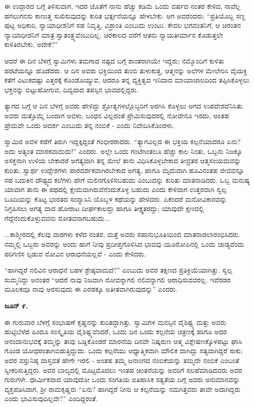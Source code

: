 ಈ ಉದ್ಗಾರದ ಬಗ್ಗೆ ತಿಳಿಸುವಾಗ, ಇದರ ಜೊತೆಗೆ ನಾನು ಹೆಚ್ಚು ಕಡಿಮೆ ಒಂದು ವರ್ಷದ ನಂತರ ಕೇಳಿದ, ನಾವೆಲ್ಲ ಹಗಲುಗನಸು ಕಾಣುತ್ತ ಸುಖಿಸುವುದನ್ನು ಕುರಿತ ಭರ್ತ್ಸನೆಯನ್ನೂ ಹೇಳಬೇಕು. ಆಗ ಅವರೆಂದರು: “ಪ್ರತಿಯೊಬ್ಬ ಸಣ್ಣ ಪುಟ್ಟ ಅಧಿಕಾರಿ, ನ್ಯಾಯಾಧೀಶನಿಗೆ ಸಹ ನಿವೃತ್ತಿ, ವಿಶ್ರಾಂತಿ ಎಂಬುದು ಉಂಟು. ಕೇವಲ ಭಗವಂತನಿಗೆ, ಆ ಚಿರಂತನ ನ್ಯಾಯಾಧೀಶನಿಗೆ ಮಾತ್ರ ಸ್ವಾತಂತ್ರ್ಯವೆಂಬುದಿಲ್ಲ. ಚಿರಕಾಲದ ವರೆಗೆ ಆತನು ನ್ಯಾಯತೀರ್ಮಾನ ಕೊಡುತ್ತಲೇ ಕುಳಿತಿರಬೇಕು, ಅದೇಕೆ?”

ಆದರೆ ಈ ದಿನ ಬೆಳಗ್ಗೆ ಸ್ವಾಮಿಗಳು ತಮಗಾದ ನಷ್ಟದ ಬಗ್ಗೆ ಶಾಂತರಾಗಿಯೇ ಇದ್ದರು; ನಮ್ಮೊಂದಿಗೆ ಕುಳಿತು ಹರಟೆಯನ್ನೂ ಹೊಡೆದರು. ಆ ದಿನ ಅವರು ಭಕ್ತಿಯಿಂದ ತುಂಬಿ ತುಳುಕುತ್ತ, ಆತ್ಮನನ್ನು ಅಲೆಗಳ ಮೇಲೇರಿಸಿ ವೈಯಕ್ತಿ ಕತೆಗೆ ಎಟುಕದಷ್ಟು ಎತ್ತರಕ್ಕೆ ಕೊಂಡೊಯ್ಯುವ, ಆದರೂ ತನ್ನ ವ್ಯಕ್ತಿತ್ವದ ಇನಿದಾದ ಮಾಯಾಜಾಲದಿಂದ ತಪ್ಪಿಸಿಕೊಳ್ಳಲು ಭಕ್ತನನ್ನು ಬಿಟ್ಟುಹೋಗುವ, ದಿವ್ಯವಾದ ತಪಸ್ಸಿನ ಭಾವದಲ್ಲಿದ್ದರು.

ತ್ಯಾಗದ ಬಗ್ಗೆ ಆ ದಿನ ಬೆಳಗ್ಗೆ ಅವರು ಹೇಳಿದ್ದು ಶ್ರೋತೃಗಳಲ್ಲೊಬ್ಬರಿಗೆ ಅರಗಿಸಿ ಕೊಳ್ಳಲು ಆಗದ ಉಪದೇಶವೆನಿಸಿತು. ಅವರು ಮತ್ತೊಮ್ಮೆ ಬಂದಾಗ ಅವಳು, ಬಂಧನ ವಿಲ್ಲದಂತೆ ಪ್ರೇಮಿಸುವುದರಲ್ಲಿ ನೋವೇನೂ ಇರದು, ಅಂತಹ ಪ್ರೇಮವೇ ಒಂದು ಆದರ್ಶ ಎಂಬುದು ತನ್ನ ನಂಬಿಕೆ - ಎಂದು ನಿವೇದಿಸಿಕೊಂಡಳು.

ಸ್ವಾಮಿಜಿ ಅವಳ ಕಡೆಗೆ ತಿರುಗಿ ಇದ್ದಕ್ಕಿದ್ದಂತೆ ಗಂಭೀರರಾದರು. “ತ್ಯಾಗವಿಲ್ಲದ ಈ ಭಕ್ತಿಯ ಕಲ್ಪನೆಯಾದರೂ ಏನು? ಅದು ಅತ್ಯಂತ ಮಾರಕವಾದುದು!” ಎಂದರು. ಅಲ್ಲೇ ಒಂದು ಗಂಟೆಗಿಂತಲೂ ಹೆಚ್ಚು ಕಾಲ ನಿಂತು, ಒಬ್ಬನು ನಿಜಕ್ಕೂ ಅಸಕ್ತನಾಗಿ ಉಳಿಯ ಬೇಕಾದರೆ ಅಗತ್ಯವಾಗಿ ತನ್ನ ಮೇಲೆ ತಾನು ವಿಧಿಸಿಕೊಳ್ಳಬೇಕಾದ ತೀವ್ರತರ ಆತ್ಮಸಂಯಮವನ್ನು ಕುರಿತು, ಸ್ವಾರ್ಥ ಉದ್ದೇಶಗಳು ಪಾರದರ್ಶಕವಾಗಿರಬೇಕಾದ ಅಗತ್ಯ, ಹಾಗೂ ಮೃದುವಾಗಿ ಹೂವಿನಂತಹ ಜೀವವನ್ನೂ ಸಹ ಬದುಕಿನ ದೌಷ್ಟ್ಯದ ಕಲೆಗಳು ಹೇಗೆ ಮಲಿನಗೊಳಿಸಬಹುದು ಎಂಬುದನ್ನು ಕುರಿತು ಮಾತನಾಡಿದರು. ಒಬ್ಬ ಮನುಷ್ಯ ಯಾವಾಗ ತಾನು ಈ ಪಥದಲ್ಲಿ ಕ್ಷೇಮವಾಗಿರುವೆನೆಂದುಕೊಳ್ಳ ಬಹುದು ಎಂದು ಕೇಳಿದಾಗ ಉತ್ತರವಾಗಿ ಸ್ವಲ್ಪ ಬೂದಿಯನ್ನು ಕೊಟ್ಟ ಭಾರತದ ಸಂನ್ಯಾಸಿನಿ ಯೊಬ್ಬಳ ಕಥೆಯನ್ನು ಹೇಳಿದರು. ಏಕೆಂದರೆ ಮನೋವಿಕಾರವನ್ನು ನಿಗ್ರಹಿಸಲು ಅಗತ್ಯ ವಾದ ಹೋರಾಟ ದೀರ್ಘಕಾಲದ್ದು ಹಾಗೂ ತೀಕ್ಷ್ಣತರದ್ದು; ಯಾವುದೇ ಕ್ಷಣದಲ್ಲಿ ಗೆದ್ದೆನೆಂದುಕೊಳ್ಳುವವನು ಸೋತವನಾಗಬಹುದು...

...ಕಾಶ್ಮೀರದಲ್ಲಿ ಕೆಲವು ವಾರಗಳು ಕಳೆದ ನಂತರ, ಮತ್ತೆ ಅವರು ಸಹಾನುಭೂತಿಯಿಂದ ಮಾತನಾಡಲಾರಂಭಿಸಿದರು. ನಮ್ಮಲ್ಲಿ ಒಬ್ಬರು ಅವರನ್ನು ಅಂದು ಹಾಗೆ ನೀವು ಪ್ರದೀಪ್ತಗೊಳಿಸಿದ ಭಾವವು ಯೂರೋಪಿನಲ್ಲಿ ಒಂದು ಜಾಡ್ಯವೆಂದು ಪರಿಗಣಿಸ ಲ್ಪಡುವ ನೋವಿನ ಆರಾಧನೆಯಲ್ಲವೆ - ಎಂದು ಕೇಳಿದರು.

“ಹಾಗಿದ್ದರೆ ನಲಿವಿನ ಆರಾಧನೆ ಬಹಳ ಶ್ರೇಷ್ಠವಾದುದೆ?” ಎಂಬುದು ಅವರ ತಕ್ಷಣದ ಪ್ರತಿಕ್ರಿಯೆಯಾಗಿತ್ತು. ಸ್ವಲ್ಪ ಸುಮ್ಮನಿದ್ದು ಅನಂತರ “ಆದರೆ ನಾವು ನಿಜವಾಗಿ ನೋವನ್ನಾಗಲಿ ನಲಿವನ್ನಾಗಲಿ ಆರಾಧಿಸುವವರಲ್ಲ. ಇವೆರಡರ ಮೂಲಕವೂ ನಾವು ಅರಸುವುದು ಈ ಎರಡಕ್ಕೂ ಅತೀತವಾಗಿರುವುದನ್ನು” ಎಂದರು.

\textbf{ಜೂನ್ ೯.}

ಈ ಗುರುವಾರ ಬೆಳಗ್ಗೆ ಸಂಭಾಷಣೆ ಕೃಷ್ಣನನ್ನು ಕುರಿತದ್ದಾಗಿತ್ತು. ಸ್ವಾಮಿಗಳ ಮನಸ್ಸಿನ ವೈಶಿಷ್ಟ್ಯ ಮತ್ತು ಅವರು ಹುಟ್ಟಿಬೆಳೆದ ಹಿಂದೂ ಸಂಸ್ಕೃತಿಯ ವೈಶಿಷ್ಟ್ಯವೆಂದರೆ, ಒಂದು ದಿನ ಒಂದು ಕಲ್ಪನೆಯ ಚಿತ್ರಣಕ್ಕೆ ಹಾಗೂ ಅದರ ಆನಂದಾನುಭವಕ್ಕೆ ತಮ್ಮನ್ನು ತಾವು ಒಡ್ಡಿಕೊಂಡರೆ ಮಾರನೆಯ ದಿನವೇ ನಿಷ್ಕರುಣ ಆತ್ಮ ವಿಶ್ಲೇಷಣಕ್ಕೊಳಪಟ್ಟು ಘಾಸಿ ಗೊಂಡ ಯೋಧರಂತಾಗಿಬಿಡುತ್ತಿದ್ದುದು. ಒಂದು ಕಲ್ಪನೆಯು ಆಧ್ಯಾತ್ಮಿಕವಾಗಿ ಮೌಲಿಕ ವಾಗಿದ್ದು ಸತ್ಯವಾಗಿದ್ದರೆ ಸಾಕು; ಅದರ ವಸ್ತುನಿಷ್ಠ ವಾಸ್ತವತೆ ಹೇಗೇ ಇರಲಿ - ಅಂತಹ ತಮ್ಮ ಜನಾಂಗದ ನಂಬಿಕೆಯನ್ನು ತಮ್ಮದೇ ನಂಬಿಕೆ ಎಂಬಂತೆ ಸ್ವೀಕರಿಸುತ್ತಿದ್ದರು. ಅವರ ಬಾಲ್ಯದಲ್ಲಿ ಮೊಟ್ಟಮೊದಲು ಇಂತಹ ಚಿಂತನೆಯನ್ನು ಅವರಿಗೆ ಸಲಹೆಮಾಡಿದವರು ಅವರ ಗುರುಗಳೇ. ಧಾರ್ಮಿಕವಾದ ಯಾವುದೋ ಒಂದು ಸಂಗತಿಯ ಐತಿಹಾಸಿಕ ಸತ್ಯತೆಯ ಬಗ್ಗೆ ಅವರು ಅನುಮಾನವನ್ನು ವ್ಯಕ್ತಪಡಿಸಿದಾಗ, ಶ‍್ರೀ ರಾಮಕೃಷ್ಣರು “ಏನು? ಹಾಗಿದ್ದರೆ ನೀನು ಆ ಕಲ್ಪನೆಯನ್ನು ನಮಗಿತ್ತವರು ತಾವೇ ಅದಾಗಿದ್ದರು ಎಂದು ಭಾವಿಸುವುದಿಲ್ಲವೇ?” ಎಂದಿದ್ದರಂತೆ.

